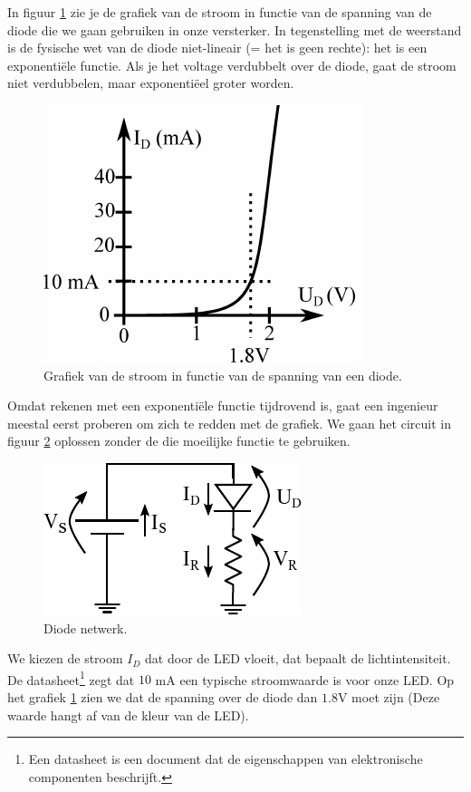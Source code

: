\documentclass{article}
\begin{document}
			In figuur \ref{fig:diode_grafiek} zie je de grafiek van de stroom in functie van de spanning van de diode die we gaan gebruiken in onze versterker. In tegenstelling met de weerstand is de fysische wet van de diode niet-lineair (= het is geen rechte): het is een exponenti\"ele functie. Als je het voltage verdubbelt over de diode, gaat de stroom niet verdubbelen, maar exponenti\"eel groter worden.
				\begin{figure}[htbp]
					\centering
					\includegraphics{diode_grafiek}
					\caption{Grafiek van de stroom in functie van de spanning van een diode.}
					\label{fig:diode_grafiek}
				\end{figure}
				
			Omdat rekenen met een exponenti\"ele functie tijdrovend is, gaat een ingenieur meestal eerst proberen om zich te redden met de grafiek. We gaan het circuit in figuur \ref{fig:diode_netwerk} oplossen zonder de die moeilijke functie te gebruiken.

			\begin{figure}[htbp]
				\centering
				\includegraphics{diode_netwerk}
				\caption{Diode netwerk.}
				\label{fig:diode_netwerk}
			\end{figure}

			We kiezen de stroom $I_D$ dat door de LED vloeit, dat bepaalt de lichtintensiteit. De datasheet\footnote{Een datasheet is een document dat de eigenschappen van elektronische componenten beschrijft.} zegt dat $10$ mA een typische stroomwaarde is voor onze LED. Op het grafiek \ref{fig:diode_grafiek} zien we dat de spanning over de diode dan $1.8 $V moet zijn (Deze waarde hangt af van de kleur van de LED). 
\end{document}
